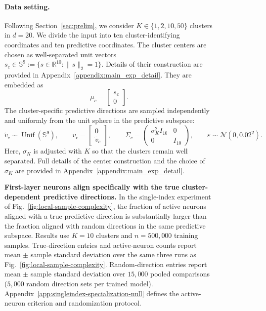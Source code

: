 \documentclass{article}
\newcounter{setting}[section]
\newcounter{model}[section]
\begin{document}
\begin{figure}
\begin{table}[H]
    \caption{\textbf{First-layer neurons align specifically with the true
    cluster-dependent predictive directions.}
    In the single-index experiment of Fig.~\ref{fig:local-sample-complexity},
    the fraction of active neurons aligned with a true predictive direction is
    substantially larger than the fraction aligned with
    random directions in the same predictive subspace. Results use \(K=10\) clusters and \(n=500{,}000\) training samples.
True-direction entries and active-neuron counts report mean \(\pm\) sample standard deviation over the
same three runs as Fig.~\ref{fig:local-sample-complexity}.
Random-direction entries report mean \(\pm\) sample standard deviation
over \(15{,}000\) pooled comparisons (\(5{,}000\) random direction sets per
trained model).
Appendix~\ref{app:singleindex-specialization-null}
    defines the active-neuron criterion and randomization protocol.}
    \label{tab:singleindex-mixed-k10-specialization-null}
\end{table}

\paragraph{Data setting.}
Following Section~\ref{sec:prelim}, we consider
\(K\in\{1,2,10,50\}\) clusters in \(d=20\). We divide the input into
ten cluster-identifying coordinates and ten predictive coordinates. The cluster centers are chosen as well-separated unit vectors $s_c\in\mathbb S^9:=\{s\in\mathbb R^{10}:\|s\|_2=1\}$. Details of their construction are provided in Appendix~\ref{appendix:main_exp_detail}. They are embedded as
\[
    \mu_c=
    \begin{bmatrix}
        s_c\\
        0
    \end{bmatrix}.
\]
The cluster-specific predictive directions are sampled independently and
uniformly from the unit sphere in the predictive subspace:
\[
    \widetilde v_c\sim\operatorname{Unif}(\mathbb S^9),
    \qquad
    v_c=
    \begin{bmatrix}
        0\\
        \widetilde v_c
    \end{bmatrix},
    \qquad
    \Sigma_c=
    \begin{pmatrix}
        \sigma_K^2 I_{10} & 0\\
        0 & I_{10}
    \end{pmatrix},
    \qquad
    \varepsilon\sim\mathcal N(0,0.02^2).
\]
Here, \(\sigma_K\) is adjusted with \(K\) so that the clusters remain well
separated. Full details of the center construction and the choice of
\(\sigma_K\) are provided in
Appendix~\ref{appendix:main_exp_detail}.


\end{figure}
\end{document}
